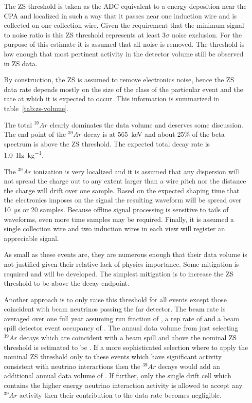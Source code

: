 The ZS threshold is taken as the ADC equivalent to a
\chargezsthreshold
energy deposition near the CPA and localized in such a way that it passes near one
induction wire and is collected on one collection wire.
Given the requirement that the minimum signal to noise ratio is
\chargeminsignalnoiseratio this ZS threshold represents at least $3\sigma$
noise exclusion.
For the purpose of this estimate it is assumed that all noise is
removed.
The threshold is low enough that most pertinent activity in the
detector volume still be observed in ZS data.


% 

By construction, the ZS is assumed to remove electronics noise, hence
the ZS data rate depends mostly on the size of the class of the
particular event and the rate at which it is expected to occur.
This information is summarized in table~\ref{tab:zs-volume}.




The total $^{39}Ar$ clearly dominates the data volume and deserves
some discussion.
The end point of the $^{39}Ar$ decay is at \SI{565}{\keV} and about
25\% of the beta spectrum is above the ZS threshold\cite{docdb3018}.
The expected total decay rate is
\SI{1.0}{\hertz\per\kilo\gram}\cite{bkds}.

The $^{39}Ar$ ionization is very localized and it is assumed that any
dispersion will not spread the charge out to any extent larger than a
wire pitch nor the distance the charge will drift over one sample.
Based on the expected shaping time that the electronics imposes on the
signal the resulting waveform will be spread over
\SI{10}{\micro\second} or \num{20} samples.
Because offline signal processing is sensitive to tails of waveforms,
even more time samples may be required.
Finally, it is assumed a single collection wire and two induction
wires in each view will register an appreciable signal.

As small as these events are, they are numerous enough that their data
volume is not justified given their relative lack of physics importance.
Some mitigation is required and will be developed.
The simplest mitigation is to increase the ZS threshold to be above
the decay endpoint.

Another approach is to only raise this threshold for all events except
those coincident with beam neutrinos passing the far detector.
The beam rate is averaged over one full year assuming run fraction of
\beamrunfraction, a rep rate of \beamreprate and a beam spill detector
event occupancy of \beameventoccupancy.
The annual data volume from just selecting $^{39}Ar$ decays which are
coincident with a beam spill and above the nominal ZS threshold is
estimated to be \betainspillyear.
If a more sophisticated selection where to apply the nominal ZS
threshold only to these events which have significant activity
consistent with neutrino interactions then the $^{39}Ar$ decays would
add an additional annual data volume of \betainbeamyear.
If further, only the single drift cell which contains the higher
energy neutrino interaction activity is allowed to accept any
$^{39}Ar$ activity then their contribution to the data rate becomes
negligible.


